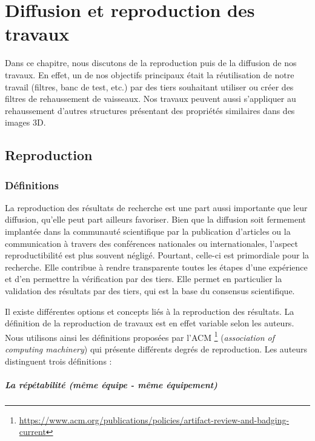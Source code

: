 \chapter{Diffusion et reproduction des travaux}
\label{sec:reproductibility}

Dans ce chapitre, nous discutons de la reproduction puis de la diffusion de nos travaux. En effet, un de nos objectifs principaux était la réutilisation de notre travail (filtres, banc de test, etc.) par des tiers souhaitant utiliser ou créer des filtres de rehaussement de vaisseaux. Nos travaux peuvent aussi s'appliquer au rehaussement d'autres structures présentant des propriétés similaires dans des images 3D.

\section{Reproduction}
\subsection{Définitions}

La reproduction des résultats de recherche est une part aussi importante que leur diffusion, qu'elle peut part ailleurs favoriser. Bien que la diffusion soit fermement implantée dans la communauté scientifique par la publication d'articles ou la communication à travers des conférences nationales ou internationales, l'aspect reproductibilité est plus souvent négligé. Pourtant, celle-ci est primordiale pour la recherche. Elle contribue à rendre transparente toutes les étapes d'une expérience et d'en permettre la vérification par des tiers. Elle permet en particulier la validation des résultats par des tiers, qui est la base du consensus scientifique.

Il existe différentes options et concepts liés à la reproduction des résultats. La définition de la reproduction de travaux est en effet variable selon les auteurs. Nous utilisons ainsi les définitions proposées par l'ACM \footnote{\url{https://www.acm.org/publications/policies/artifact-review-and-badging-current}} (\textit{association of computing machinery}) qui présente différents degrés de reproduction. Les auteurs distinguent trois définitions : 

\paragraph{La répétabilité (même équipe - même équipement)}

